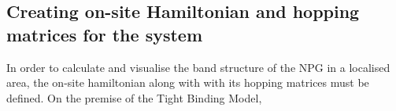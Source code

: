 \subsection{Creating on-site Hamiltonian and hopping matrices for the system}
In order to calculate and visualise the band structure of the NPG in a localised area, the on-site hamiltonian along with with its hopping matrices must be defined. On the premise of the Tight Binding Model,
